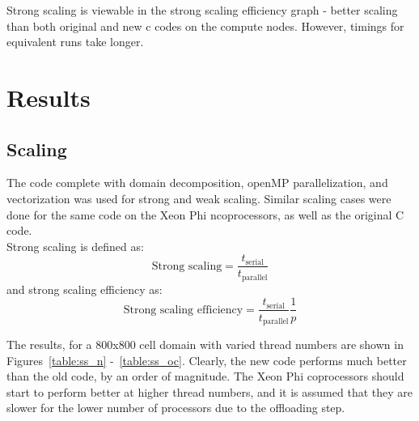 \documentclass{article}
\begin{document}
Strong scaling is viewable in the strong scaling efficiency graph - better scaling than both original and new c codes on the compute nodes. However, timings for equivalent runs take longer.
\clearpage
\section{Results}
\subsection{Scaling}
The code complete with domain decomposition, openMP parallelization, and vectorization was used for strong and weak scaling. Similar scaling cases were done for the same code on the Xeon Phi ncoprocessors, as well as the original C code. \\

Strong scaling is defined as:
\begin{equation}
\textrm{Strong scaling} = \frac{t_{\textrm{serial}}}{t_{\textrm{parallel}}}
\end{equation}
\indent and strong scaling efficiency as:
\begin{equation}
\textrm{Strong scaling efficiency} =   \frac{t_{\textrm{serial}}}{t_{\textrm{parallel}}}\frac{1}{p}
\end{equation}

The results, for a 800x800 cell domain with varied thread numbers are shown in Figures~\ref{table:ss_n} -~\ref{table:ss_oc}. Clearly, the new code performs much better than the old code, by an order of magnitude. The Xeon Phi coprocessors should start to perform better at higher thread numbers, and it is assumed that they are slower for the lower number of processors due to the offloading step. \\
\end{document}
